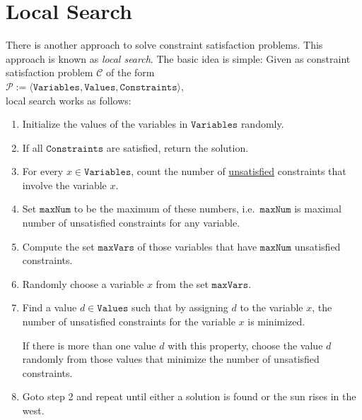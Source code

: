 \section{Local Search}
There is another approach to solve constraint satisfaction problems.  This approach is known as
\emph{\color{blue}local search}.  The basic idea is simple: Given as constraint satisfaction problem 
$\mathcal{C}$ of the form 
\\[0.2cm]
\hspace*{1.3cm}
$\mathcal{P} := \langle \mathtt{Variables}, \mathtt{Values}, \mathtt{Constraints} \rangle$,
\\[0.2cm] 
local search works as follows:
\begin{enumerate}
\item Initialize the values of the variables in $\mathtt{Variables}$ randomly.  
\item If all $\mathtt{Constraints}$ are satisfied, return the solution.
\item For every  $x \in \mathtt{Variables}$, count the number of \underline{unsatisfied} constraints that involve the
      variable $x$. 
\item Set $\mathtt{maxNum}$ to be the maximum of these numbers, i.e.~$\mathtt{maxNum}$ is maximal number of
      unsatisfied constraints for any variable.
\item Compute the set $\mathtt{maxVars}$ of those variables that have $\mathtt{maxNum}$ unsatisfied constraints.
\item Randomly choose a variable $x$ from the set $\mathtt{maxVars}$.
\item Find a value $d \in \mathtt{Values}$ such that by assigning $d$ to the variable $x$, the number of
      unsatisfied constraints for the variable $x$ is minimized.  

      If there is more than one value $d$ with this property, choose the value $d$ randomly from those values
      that minimize the number of unsatisfied constraints.
\item Goto step 2 and repeat until either a solution is found or the sun rises in the west.
\end{enumerate}

